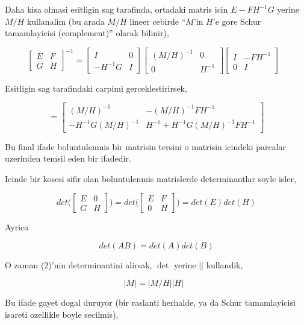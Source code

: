 \documentclass[12pt,fleqn]{article}\usepackage{../common}
\begin{document}
Daha kisa olmasi esitligin sag tarafinda, ortadaki matris icin
$E-FH^{-1}G$ yerine $M/H$ kullanalim (bu arada $M/H$ lineer cebirde ``$M$'in
$H$'e gore Schur tamamlayicisi (complement)'' olarak bilinir),

\[ 
\left[\begin{array}{rr}
E & F \\
G & H
\end{array}\right]^{-1}
=
\left[\begin{array}{rr}
I & 0 \\
-H^{-1}G & I
\end{array}\right] 
\left[\begin{array}{rr}
(M/H)^{-1} & 0 \\
0 & H^{-1}
\end{array}\right]
\left[\begin{array}{rr}
I & -FH^{-1} \\
0 & I
\end{array}\right] 
\ \ \ \label{3}
 \]

Esitligin sag tarafindaki carpimi gerceklestirirsek, 

\[ =
\left[\begin{array}{rr}
(M/H)^{-1} & -(M/H)^{-1}FH^{-1} \\
-H^{-1}G(M/H)^{-1} & H^{-1}+H^{-1}G(M/H)^{-1}FH^{-1} 
\end{array}\right]
 \]

Bu final ifade boluntulenmis bir matrisin tersini o matrisin icindeki parcalar
uzerinden temsil eden bir ifadedir. 

Icinde bir kosesi sifir olan boluntulenmis matrislerde determinantlar soyle
isler,

\[ 
det \bigg(
\left[\begin{array}{rr}
E & 0 \\
G & H
\end{array}\right]
\bigg) 
= 
det \bigg(
\left[\begin{array}{rr}
E & F \\
0 & H
\end{array}\right] 
\bigg) =
det(E)det(H)
 \]

Ayrica 

\[ det(AB) = det(A)det(B) \]

O zaman (2)'nin determinantini alirsak, $\det$ yerine $||$ kullandik, 

\[ |M| = |M/H||H| 
\ \ \ \label{4}
\]

Bu ifade gayet dogal duruyor (bir raslanti herhalde, ya da Schur tamamlayicisi 
isareti ozellikle boyle secilmis),
\end{document}

